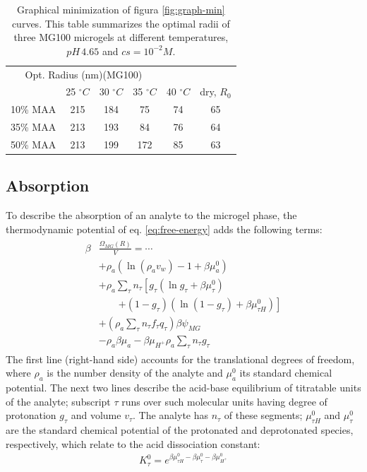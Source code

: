 \begin{table}[!htb]
\small
  \begin{tabular}{|lccccc|}
    \hline
      \multicolumn{4}{c}{Opt. Radius (nm)(MG100)} \\
      & {25 $^\circ C$} & {30 $^\circ C$} & {35 $^\circ C$} & {40 $^\circ C$} & {dry, $R_0$} \\
      \hline
    10\% MAA & 215 &  184 &  75  &  74 & 65\\
    35\% MAA &  213 &  193 &  84 & 76 & 64\\
    50\% MAA &  213 & 199 &  172 & 85 & 63\\
    \hline
  \end{tabular}
 \caption{Graphical minimization of figura \ref{fig:graph-min} curves.
 This table summarizes the optimal radii of three MG100 microgels at different temperatures, $pH\,4.65$ and $cs=10^{-2}M$.}
\label{table:optimal-R} 
\end{table}


\subsection{Absorption}




To describe the absorption of an analyte to the microgel phase, 
the thermodynamic potential of eq. \ref{eq:free-energy} adds the following terms:
%
%
\begin{align}
\begin{aligned}
\beta&\frac{\Omega_{MG}(R)}{V}= \cdots\\&+ \rho_a\left(\ln\left(\rho_a v_w\right) -1 + \beta\mu^0_a\right) \\
& + \rho_a \sum_\tau n_\tau  \left[g_\tau(\ln g_\tau+ \beta\mu^0_{\tau})\right.\\
&\qquad\left.+(1-g_\tau)(\ln (1-g_\tau)+\beta\mu^0_{\tau H})\right] \\
& +  \left( \rho_a \sum_\tau n_\tau f_\tau q_\tau\right)\beta\psi_{MG}\\
& -\rho_a\beta\mu_a
 -\beta\mu_{H^+} \rho_a \sum_\tau n_\tau g_\tau
\end{aligned}
\label{eq:ads}
\end{align}
%
\noindent The first line (right-hand side) accounts for the translational degrees of freedom,
where $\rho_a$ is the number density of the analyte and $\mu_a^0$ its standard chemical potential.
The next two lines describe the acid-base equilibrium of titratable units of the analyte;
subscript $\tau$ runs over such molecular units having degree of protonation $g_\tau$ and volume $v_\tau$.
The analyte has $n_\tau$ of these segments;
$\mu^0_{\tau H}$ and $\mu^0_\tau$ are the standard chemical potential of the protonated and deprotonated species, respectively, which relate to the acid dissociation constant:
%
\begin{align}
K^0_{\tau}= e^{\beta\mu^0_{\tau H}-\beta\mu^0_{\tau}-\beta\mu^0_{H^+}}
\end{align}
%

